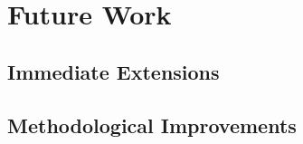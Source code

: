 \section{Future Work}

\subsection{Immediate Extensions}

\subsection{Methodological Improvements}

